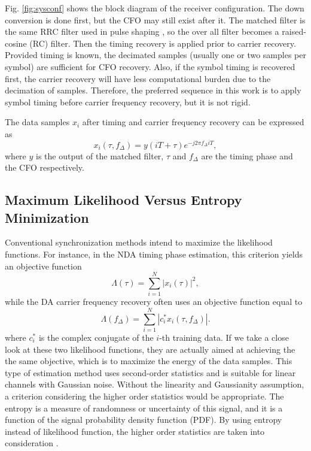 \documentclass[journal,comsoc]{IEEEtran}
\begin{document}
Fig. \ref{fig:sysconf} shows the block diagram of the receiver configuration.
The down conversion is done first, but the CFO may still exist after it.
The matched filter is the same RRC filter used in pulse shaping , so the over all filter becomes a raised-cosine (RC) filter. 
Then the timing recovery is applied prior to carrier recovery.
Provided timing is known, the decimated samples (usually one or two samples per symbol) are sufficient for CFO recovery.
Also, if the symbol timing is recovered first, the carrier recovery will have less computational burden due to the decimation of samples.
Therefore, the preferred sequence in this work is to apply symbol timing before carrier frequency recovery, but it is not rigid.

The data samples \(x_i\) after timing and carrier frequency recovery can be expressed as
\begin{equation}
{x_i}( \tau ,{f_\Delta }) = y(iT +  \tau ){e^{ - j2\pi {f_\Delta }iT}},
\end{equation}
where \(y\) is the output of the matched filter, \(\tau\) and \(f_\Delta\) are the timing phase and the CFO respectively.


\subsection{Maximum Likelihood Versus Entropy Minimization}
Conventional synchronization methods intend to maximize the likelihood functions.
For instance, in the NDA timing phase estimation, this criterion yields an objective function
\begin{equation}
\Lambda(\tau) =\sum\limits_{i = 1}^N {{{\left| {{x_i}( \tau )} \right|}^2}}, 
\end{equation}
while the DA carrier frequency recovery often uses an objective function equal to
\begin{equation}
\Lambda ({f_\Delta })=\sum\limits_{i = 1}^N {{{\left| {c_i^*{x_i}(\tau ,{f_\Delta })} \right|}}}. 
\end{equation}
where \(c_i^*\) is the complex conjugate of the \(i\)-th training data.
If we take a close look at these two likelihood functions, they are actually aimed at achieving the the same objective, which is to maximize the energy of the data samples.
This type of estimation method uses second-order statistics and is suitable for linear channels with Gaussian noise.
Without the linearity and Gaussianity assumption, a criterion considering the higher order statistics would be appropriate.
The entropy is a measure of randomness or uncertainty of this signal, and it is a function of the signal probability density function (PDF).
By using entropy instead of likelihood function, the higher order statistics are taken into consideration \cite{Santamaria2002}.
\end{document}
